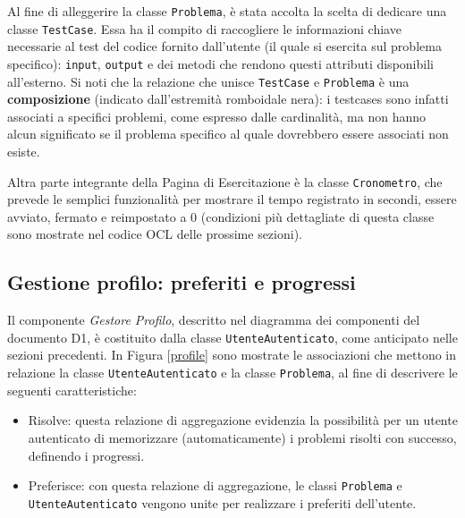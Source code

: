 \documentclass[11pt, a4paper]{article}
\theoremstyle{definition} %
\begin{document}
Al fine di alleggerire la classe \texttt{Problema}, è stata accolta la scelta di
dedicare una classe \texttt{TestCase}. Essa ha il compito di raccogliere le informazioni
chiave necessarie al test del codice fornito dall'utente (il quale si esercita
sul problema specifico): \texttt{input}, \texttt{output} e dei metodi che rendono
questi attributi disponibili all'esterno.
Si noti che la relazione che unisce \texttt{TestCase} e \texttt{Problema} è
una \textbf{composizione} (indicato dall'estremità romboidale nera): i testcases
sono infatti associati a specifici problemi, come espresso dalle cardinalità,
ma non hanno alcun significato se il problema specifico al quale dovrebbero
essere associati non esiste.

Altra parte integrante della Pagina di Esercitazione è la classe \texttt{Cronometro},
che prevede le semplici funzionalità per mostrare il tempo registrato in secondi,
essere avviato, fermato e reimpostato a 0 (condizioni più dettagliate
di questa classe sono mostrate nel codice OCL delle prossime sezioni).


\newpage
\subsection{Gestione profilo: preferiti e progressi}
Il componente \textit{Gestore Profilo}, descritto nel diagramma dei componenti
del documento D1, è costituito dalla classe \texttt{UtenteAutenticato},
come anticipato nelle sezioni precedenti. In Figura \ref{profile} sono
mostrate le associazioni che mettono in relazione la classe \texttt{UtenteAutenticato}
e la classe \texttt{Problema}, al fine di descrivere le seguenti
caratteristiche:
\begin{itemize}
    \item Risolve: questa relazione di aggregazione evidenzia la possibilità
    per un utente autenticato di memorizzare (automaticamente) i problemi
    risolti con successo, definendo i progressi.

    \item Preferisce: con questa relazione di aggregazione, le classi
    \texttt{Problema} e \texttt{UtenteAutenticato} vengono unite per realizzare i preferiti
    dell'utente.
\end{itemize}
\end{document}
